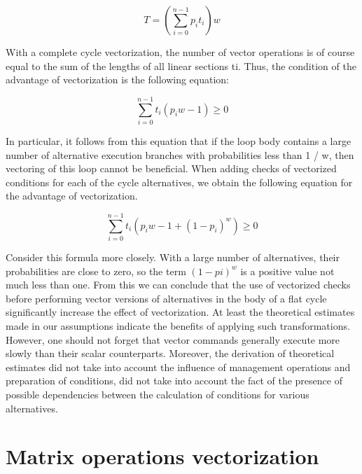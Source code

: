 \documentclass[
11pt,%
tightenlines,%
twoside,%
onecolumn,%
nofloats,%
nobibnotes,%
nofootinbib,%
superscriptaddress,%
noshowpacs,%
centertags]%
{revtex4}
\begin{document}
\begin{equation}
T = \left( \sum_{i = 0}^{n - 1}{p_it_i} \right) w
\end{equation}

With a complete cycle vectorization, the number of vector operations is of course equal to the sum of the lengths of all linear sections ti. Thus, the condition of the advantage of vectorization is the following equation:

\begin{equation}
\sum_{i = 0}^{n - 1}{t_i(p_iw - 1)} \ge 0
\end{equation}

In particular, it follows from this equation that if the loop body contains a large number of alternative execution branches with probabilities less than 1 / w, then vectoring of this loop cannot be beneficial. When adding checks of vectorized conditions for each of the cycle alternatives, we obtain the following equation for the advantage of vectorization.

\begin{equation}
\sum_{i = 0}^{n - 1}{t_i \left( p_iw - 1 + (1 - p_i) ^w \right) } \ge 0
\end{equation}

Consider this formula more closely. With a large number of alternatives, their probabilities are close to zero, so the term $(1 - pi) ^ w$ is a positive value not much less than one. From this we can conclude that the use of vectorized checks before performing vector versions of alternatives in the body of a flat cycle significantly increase the effect of vectorization. At least the theoretical estimates made in our assumptions indicate the benefits of applying such transformations. However, one should not forget that vector commands generally execute more slowly than their scalar counterparts. Moreover, the derivation of theoretical estimates did not take into account the influence of management operations and preparation of conditions, did not take into account the fact of the presence of possible dependencies between the calculation of conditions for various alternatives.

\section{Matrix operations vectorization}
\end{document}
